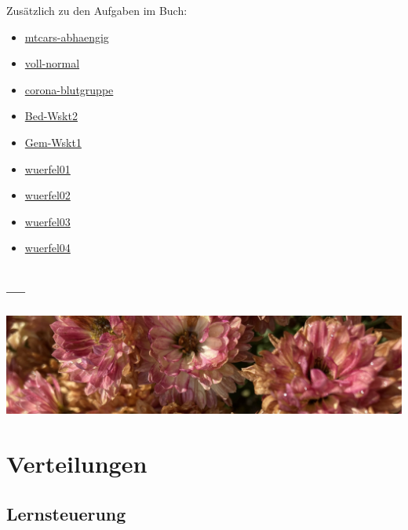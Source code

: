 \documentclass[
  a4paper,
  DIV=11]{scrreprt}
\providecommand{\tightlist}{%
  \setlength{\itemsep}{0pt}\setlength{\parskip}{0pt}}\usepackage{longtable,booktabs,array}
\theoremstyle{definition}
\theoremstyle{remark}
\begin{document}
Zusätzlich zu den Aufgaben im Buch:

\begin{itemize}
\tightlist
\item
  \href{https://datenwerk.netlify.app/posts/mtcars-abhaengig/mtcars-abhaengig.html}{mtcars-abhaengig}
\item
  \href{https://datenwerk.netlify.app/posts/voll-normal/voll-normal.html}{voll-normal}
\item
  \href{https://datenwerk.netlify.app/posts/corona-blutgruppe/corona-blutgruppe.html}{corona-blutgruppe}
\item
  \href{https://datenwerk.netlify.app/posts/bed-wskt2/bed-wskt2}{Bed-Wskt2}
\item
  \href{https://datenwerk.netlify.app/posts/gem-wskt1/gem-wskt1}{Gem-Wskt1}
\item
  \href{https://datenwerk.netlify.app/posts/wuerfel01/wuerfel01.html}{wuerfel01}
\item
  \href{https://datenwerk.netlify.app/posts/wuerfel02/wuerfel02.html}{wuerfel02}
\item
  \href{https://datenwerk.netlify.app/posts/wuerfel03/wuerfel03.html}{wuerfel03}
\item
  \href{https://datenwerk.netlify.app/posts/wuerfel04/wuerfel04.html}{wuerfel04}
\end{itemize}

\hypertarget{section-2}{%
\section{---}\label{section-2}}

\includegraphics[width=1\textwidth,height=\textheight]{./img/outro-03.jpg}


\hypertarget{verteilungen}{%
\chapter{Verteilungen}\label{verteilungen}}

\hypertarget{lernsteuerung-2}{%
\section{Lernsteuerung}\label{lernsteuerung-2}}
\end{document}

